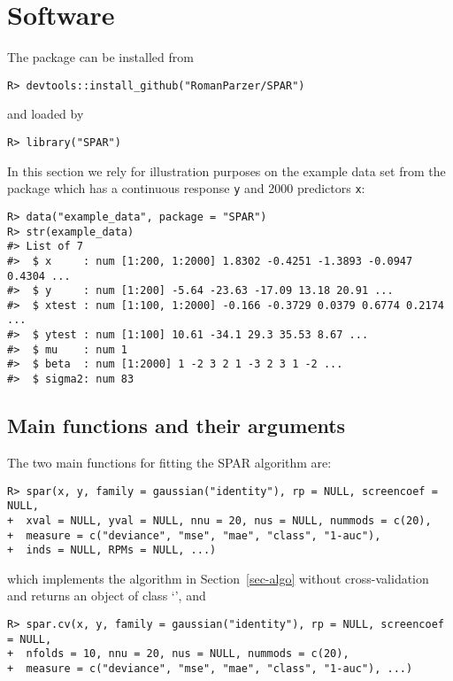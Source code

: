 \documentclass[
  article]{jss}
\newcommand{\class}[1]{`\code{#1}'}
\begin{document}
\section{Software}\label{sec-software}

The package can be installed from 

\begin{verbatim}
R> devtools::install_github("RomanParzer/SPAR")
\end{verbatim}

and loaded by

\begin{verbatim}
R> library("SPAR")
\end{verbatim}

In this section we rely for illustration purposes on the example data
set from the package which has a continuous response \texttt{y} and 2000
predictors \texttt{x}:

\begin{verbatim}
R> data("example_data", package = "SPAR")
R> str(example_data)
#> List of 7
#>  $ x     : num [1:200, 1:2000] 1.8302 -0.4251 -1.3893 -0.0947 0.4304 ...
#>  $ y     : num [1:200] -5.64 -23.63 -17.09 13.18 20.91 ...
#>  $ xtest : num [1:100, 1:2000] -0.166 -0.3729 0.0379 0.6774 0.2174 ...
#>  $ ytest : num [1:100] 10.61 -34.1 29.3 35.53 8.67 ...
#>  $ mu    : num 1
#>  $ beta  : num [1:2000] 1 -2 3 2 1 -3 2 3 1 -2 ...
#>  $ sigma2: num 83
\end{verbatim}

\subsection{Main functions and their
arguments}\label{main-functions-and-their-arguments}

The two main functions for fitting the SPAR algorithm are:

\begin{verbatim}
R> spar(x, y, family = gaussian("identity"), rp = NULL, screencoef = NULL,
+  xval = NULL, yval = NULL, nnu = 20, nus = NULL, nummods = c(20),
+  measure = c("deviance", "mse", "mae", "class", "1-auc"),
+  inds = NULL, RPMs = NULL, ...)
\end{verbatim}

which implements the algorithm in Section~\ref{sec-algo} without
cross-validation and returns an object of class \class{spar}, and

\begin{verbatim}
R> spar.cv(x, y, family = gaussian("identity"), rp = NULL, screencoef = NULL,
+  nfolds = 10, nnu = 20, nus = NULL, nummods = c(20),
+  measure = c("deviance", "mse", "mae", "class", "1-auc"), ...)
\end{verbatim}
\end{document}
